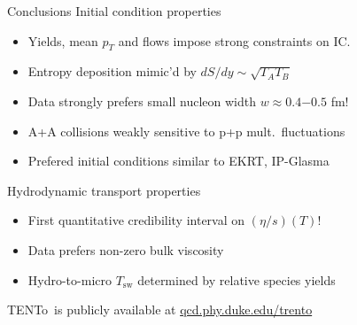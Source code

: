 \documentclass[xcolor=dvipsnames]{beamer}
\newcommand{\trento}{T\raisebox{-0.3ex}{R}ENTo}
\begin{document}
\begin{frame}{Conclusions}
\medskip
Initial condition properties
\begin{itemize}
    \item Yields, mean $p_T$ and flows impose strong constraints on IC. \\
    \item Entropy  deposition mimic'd by $dS/dy \sim \sqrt{T_A T_B}$ \\
    \item Data strongly prefers small nucleon width $w \approx 0.4\mathrm{-}0.5$ fm! \\
    \item A+A collisions weakly sensitive to p+p mult.\ fluctuations \\
    \item Prefered initial conditions similar to EKRT, IP-Glasma \\
\end{itemize}
\smallskip
Hydrodynamic transport properties
\begin{itemize}
    \item First quantitative credibility interval on $(\eta/s)(T)$!
    \item Data prefers non-zero bulk viscosity
    \item Hydro-to-micro $T_\text{sw}$ determined by relative species yields 
\end{itemize}
\vfill
\trento\ is publicly available at \url{qcd.phy.duke.edu/trento}
\end{frame}
\end{document}
